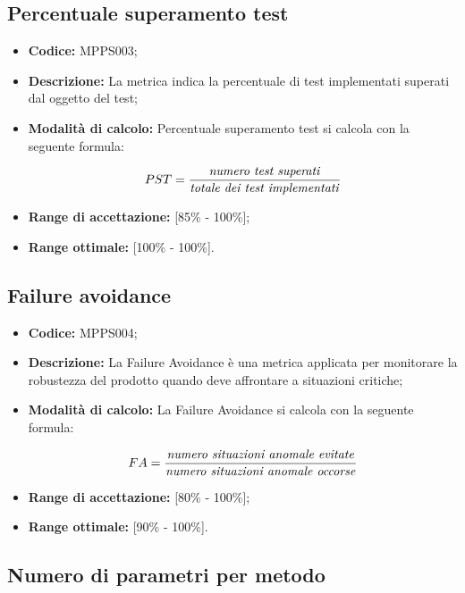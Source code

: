 \documentclass[openany,12pt,a4paper]{report}
\begin{document}
\subsection{Percentuale superamento test}

\begin{itemize}
    \item \textbf{Codice:} MPPS003;
    \item \textbf{Descrizione:} La metrica indica la percentuale di test implementati superati dal oggetto del test;
    \item \textbf{Modalità di calcolo:} Percentuale superamento test si calcola con la seguente formula:
    
    \[ PST = \frac{\textrm{\textit{numero test superati}}}{\textrm{\textit{totale dei test implementati}}} \]
    
    \item \textbf{Range di accettazione:} [85\% - 100\%];
    \item \textbf{Range ottimale:} [100\% - 100\%].
\end{itemize}

\subsection{Failure avoidance}

\begin{itemize}
    \item \textbf{Codice:} MPPS004;
    \item \textbf{Descrizione:} La Failure Avoidance è una metrica applicata per monitorare la robustezza del prodotto quando deve affrontare a situazioni critiche;
    \item \textbf{Modalità di calcolo:} La Failure Avoidance si calcola con la seguente formula:
    
    \[ FA = \frac{\textrm{\textit{numero situazioni anomale evitate}}}{\textrm{\textit{numero situazioni anomale occorse}}} \]
    
    \item \textbf{Range di accettazione:} [80\% - 100\%];
    \item \textbf{Range ottimale:} [90\% - 100\%].
\end{itemize}

\subsection{Numero di parametri per metodo}
\end{document}
